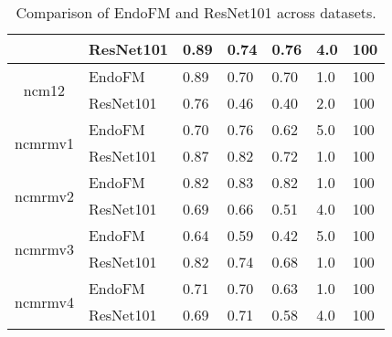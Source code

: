 \begin{table}[h]
\begin{tabular}{cllllll}
     & ResNet101 & 0.89 & 0.74 & 0.76 & 4.0 & 100 \\
    \midrule
    \multirow{2}{*}{ncm12}
 & EndoFM & 0.89 & 0.70 & 0.70 & 1.0 & 100 \\
     & ResNet101 & 0.76 & 0.46 & 0.40 & 2.0 & 100 \\
    \midrule
    \multirow{2}{*}{ncmrmv1}
 & EndoFM & 0.70 & 0.76 & 0.62 & 5.0 & 100 \\
     & ResNet101 & 0.87 & 0.82 & 0.72 & 1.0 & 100 \\
    \midrule
    \multirow{2}{*}{ncmrmv2}
 & EndoFM & 0.82 & 0.83 & 0.82 & 1.0 & 100 \\
     & ResNet101 & 0.69 & 0.66 & 0.51 & 4.0 & 100 \\
    \midrule
    \multirow{2}{*}{ncmrmv3}
 & EndoFM & 0.64 & 0.59 & 0.42 & 5.0 & 100 \\
     & ResNet101 & 0.82 & 0.74 & 0.68 & 1.0 & 100 \\
    \midrule
    \multirow{2}{*}{ncmrmv4}
 & EndoFM & 0.71 & 0.70 & 0.63 & 1.0 & 100 \\
     & ResNet101 & 0.69 & 0.71 & 0.58 & 4.0 & 100 \\
    \midrule
    \bottomrule
    \end{tabular}
    \vspace{-0.1in}
    \caption{Comparison of EndoFM and ResNet101 across datasets.}
    \label{tab:performance_comparison}
\end{table}
